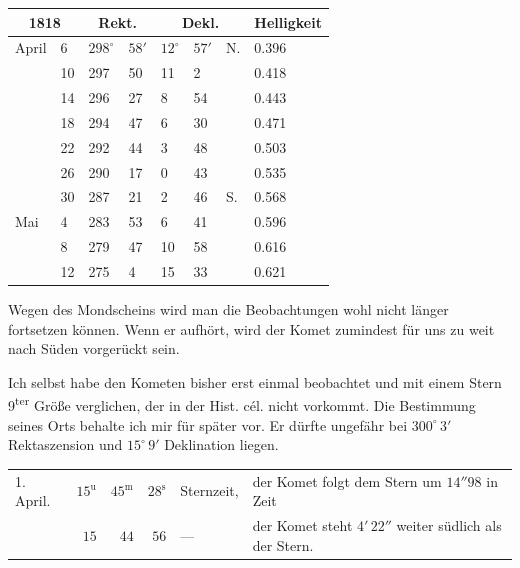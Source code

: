 \begin{center}\fontsize{10}{12}\selectfont\setlength{\tabcolsep}{3pt}
\begin{tabular}{ll|ll|lll|l}
\multicolumn{2}{c|}{1818} & \multicolumn{2}{c|}{Rekt.} & \multicolumn{3}{c|}{Dekl.} & Helligkeit \\
\hline
April & 6  & $298^\circ$ & $58'$ & $12^\circ$ & $57'$ & N. & 0.396 \\
      & 10 & 297 & 50 & 11 & 2  &    & 0.418 \\
      & 14 & 296 & 27 & 8  & 54 &    & 0.443 \\
      & 18 & 294 & 47 & 6  & 30 &    & 0.471 \\
      & 22 & 292 & 44 & 3  & 48 &    & 0.503 \\
      & 26 & 290 & 17 & 0  & 43 &    & 0.535 \\
      & 30 & 287 & 21 & 2  & 46 & S. & 0.568 \\
Mai   & 4  & 283 & 53 & 6  & 41 &    & 0.596 \\
      & 8  & 279 & 47 & 10 & 58 &    & 0.616 \\
      & 12 & 275 & 4  & 15 & 33 &    & 0.621 \\
\end{tabular}
\end{center}

\par\indent Wegen des Mondscheins wird man die Beobachtungen wohl nicht länger fortsetzen können. Wenn er aufhört, wird der Komet zumindest für uns zu weit nach Süden vorgerückt sein.

\par\indent Ich selbst habe den Kometen bisher erst einmal beobachtet und mit einem Stern 9\textsuperscript{ter} Größe verglichen, der in der Hist. cél. nicht vorkommt. Die Bestimmung seines Orts behalte ich mir für später vor. Er dürfte ungefähr bei $300^\circ\,3'$ Rektaszension und $15^\circ\,9'$ Deklination liegen.

\begin{center}\fontsize{9}{11}\selectfont\setlength{\tabcolsep}{3pt}\begin{tabular}{lrrrll}
1. April. & $15^{\mathrm u}$ & $45^{\mathrm m}$ & $28^{\mathrm s}$ & Sternzeit, & \shortstack[l]{der Komet folgt dem Stern um\\$14''98$ in Zeit}\\
& $15$ & $44$ & $56$ & — & \shortstack[l]{der Komet steht $4'\,22''$\\weiter südlich als der Stern.}\\
\end{tabular}\end{center}

